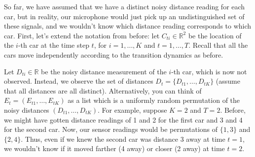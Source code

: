 \documentclass[10pt]{article}
\begin{document}
So far, we have assumed that we have a distinct noisy distance reading for each car, but in reality, our microphone would just pick up an undistinguished set of these signals, and we wouldn't know which distance reading corresponds to which car. First, let's extend the notation from before: let $C_{ti} \in \mathbb{R}^2$ be the location of the $i$-th car at the time step $t$, for $i = 1, \dots, K$ and $t = 1, \dots, T$. Recall that all the cars move independently according to the transition dynamics as before.
\smallskip 

Let $D_{ti} \in \mathbb{R}$ be the noisy distance measurement of the $i$-th car, which is now not observed. Instead, we observe the set of distances $D_t = \{D_{t1}, \dots, D_{tK}\}$ (assume that all distances are all distinct). Alternatively, you can think of $E_t = (E_{t1}, \dots, E_{tK})$ as a list which is a uniformly random permutation of the noisy distances $(D_{t1}, \dots, D_{tK})$. For example, suppose $K = 2$ and $T = 2$. Before, we might have gotten distance readings of 1 and 2 for the first car and 3 and 4 for the second car. Now, our sensor readings would be permutations of $\{1, 3\}$ and $\{2 ,4\}$. Thus, even if we knew the second car was distance 3 away at time $t = 1$, we wouldn't know if it moved farther (4 away) or closer (2 away) at time $t = 2$.
\end{document}
